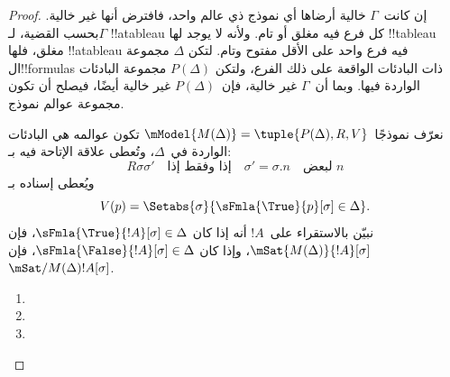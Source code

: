 \documentclass[../../../include/open-logic-section]{subfiles}
\begin{document}
\begin{proof}
إن كانت~$\Gamma$ خالية أرضاها أي نموذج ذي عالم واحد، فافترض أنها غير
خالية. بحسب القضية، لـ$\Gamma$ !!a{tableau} كل فرع فيه مغلق أو تام. ولأنه لا
يوجد لها !!{tableau} مغلق، فلها !!a{tableau} فيه فرع واحد على الأقل
مفتوح وتام. لتكن $\Delta$ مجموعة ال!!{formula}s ذات البادئات الواقعة
على ذلك الفرع، ولتكن $P(\Delta)$ مجموعة البادئات الواردة فيها.
وبما أن~$\Gamma$ غير خالية، فإن~$P(\Delta)$ غير خالية أيضًا، فيصلح أن
تكون مجموعة عوالم نموذج.

نعرّف نموذجًا~$\mModel{M(\Delta)} = \tuple{P(\Delta), R, V}$ تكون
عوالمه هي البادئات الواردة في~$\Delta$، وتُعطى علاقة الإتاحة فيه بـ:
\[
R\sigma\sigma' \quad \text{إذا وفقط إذا} \quad
\sigma'=\sigma.n \quad \text{لبعض~$n$}
\]
ويُعطى إسناده بـ
\[
V(p) = \Setabs{\sigma}{\sFmla{\True}{p}[\sigma] \in \Delta}.
\]
نبيّن بالاستقراء على~$!A$ أنه إذا كان $\sFmla{\True}{!A}[\sigma] \in
\Delta$، فإن $\mSat{M(\Delta)}{!A}[\sigma]$، وإذا كان
$\sFmla{\False}{!A}[\sigma] \in \Delta$، فإن
$\mSat/{M(\Delta)}{!A}[\sigma]$.

\begin{enumerate}
  \item {}
  \item {}
  \item {}
\end{enumerate}
\end{proof}
\end{document}
